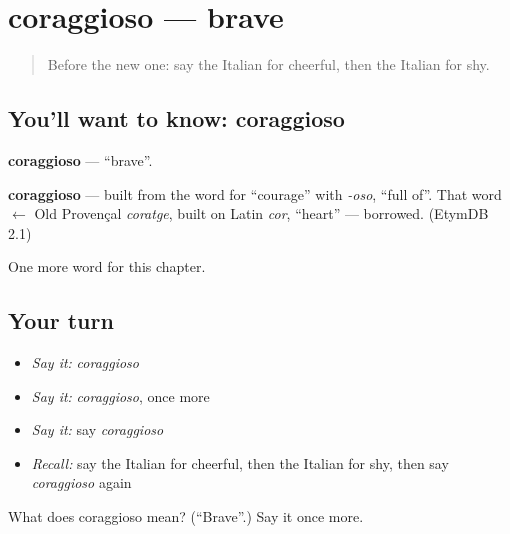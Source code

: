 \section[coraggioso]{coraggioso — brave}

\label{lesson:IT-C189-coraggioso}



\begin{quote}
Before the new one: say the Italian for cheerful, then the Italian for shy.
\end{quote}

\subsection*{You'll want to know: coraggioso}
\textbf{coraggioso} — \textquotedblleft{}brave\textquotedblright{}.

\begin{cousinweb}
\textbf{coraggioso} — built from the word for \textquotedblleft{}courage\textquotedblright{} with \emph{-oso}, \textquotedblleft{}full of\textquotedblright{}. That word $\leftarrow$ Old Provençal \emph{coratge}, built on Latin \emph{cor}, \textquotedblleft{}heart\textquotedblright{} — borrowed. (EtymDB 2.1)
\end{cousinweb}

\begin{grammarlens}[title={What you've built}]
One more word for this chapter.
\end{grammarlens}

\subsection*{Your turn}
\begin{itemize}
\raggedright
  \item \emph{Say it:} \emph{coraggioso}
  \item \emph{Say it:} \emph{coraggioso}, once more
  \item \emph{Say it:} say \emph{coraggioso}
  \item \emph{Recall:} say the Italian for cheerful, then the Italian for shy, then say \emph{coraggioso} again
\end{itemize}

\begin{tcolorbox}[breakable,colback=teal!4,colframe=teal!35!black,title={Before you move on}]
What does coraggioso mean? (\textquotedblleft{}Brave\textquotedblright{}.) Say it once more.
\end{tcolorbox}
